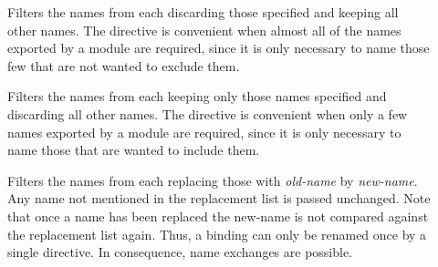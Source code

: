 \begin{optDefinition}
\begin{description}
    \item[] 
    Filters the names from each  discarding those
    specified and keeping all other names.  The  directive is
    convenient when almost all of the names exported by a module are required,
    since it is only necessary to name those few that are not wanted to exclude
    them.

    \item[]  Filters the
    names from each  keeping only those names specified
    and discarding all other names.  The  directive is
    convenient when only a few names exported by a module are required, since it
    is only necessary to name those that are wanted to include them.

    \item[] 
    Filters the names from each  replacing those with
    {\em old-name} by {\em new-name}.  Any name not mentioned in the replacement
    list is passed unchanged.  Note that once a name has been replaced the
    new-name is not compared against the replacement list again.  Thus, a
    binding can only be renamed once by a single  directive.
    In consequence, name exchanges are possible.
\end{description}
\end{optDefinition}
%
